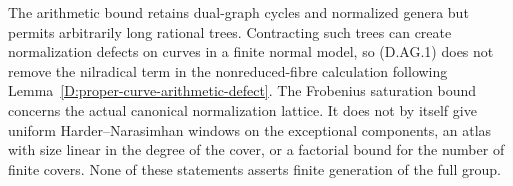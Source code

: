 \begin{remark}
The arithmetic bound retains dual-graph cycles and normalized
genera but permits arbitrarily long rational trees. Contracting
such trees can create normalization defects on curves in a
finite normal model, so (D.AG.1) does not remove the nilradical
term in the nonreduced-fibre calculation following
Lemma~\ref{D:proper-curve-arithmetic-defect}.
The Frobenius saturation bound concerns the actual canonical
normalization lattice. It does not by itself give uniform
Harder--Narasimhan windows on the exceptional components,
an atlas with size linear in the degree of the cover, or a
factorial bound for the number of finite covers. None of these
statements asserts finite generation of the full group.
\end{remark}
